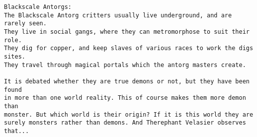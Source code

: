 \goodbreak \begin{samepage} \small \begin{verbatim}
Blackscale Antorgs:
The Blackscale Antorg critters usually live underground, and are rarely seen.
They live in social gangs, where they can metromorphose to suit their role.
They dig for copper, and keep slaves of various races to work the digs sites.
They travel through magical portals which the antorg masters create.

It is debated whether they are true demons or not, but they have been found
in more than one world reality. This of course makes them more demon than
monster. But which world is their origin? If it is this world they are
surely monsters rather than demons. And Therephant Velasier observes that...
\end{verbatim} \normalsize \end{samepage}

\

